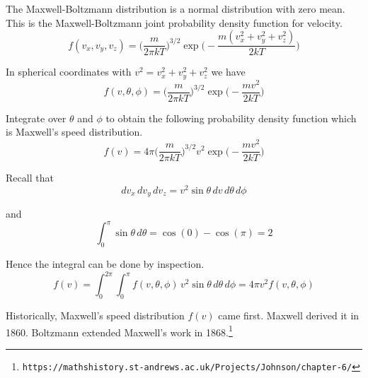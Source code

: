 \documentclass[12pt]{article}
\begin{document}
The Maxwell-Boltzmann distribution is a normal distribution with zero mean.
This is the Maxwell-Boltzmann joint probability density function for velocity.
\begin{equation*}
f(v_x,v_y,v_z)=
\bigg(\frac{m}{2\pi kT}\bigg)^{3/2}
\exp\bigg({-}\frac{m(v_x^2+v_y^2+v_z^2)}{2kT}\bigg)
\end{equation*}

In spherical coordinates with $v^2=v_x^2+v_y^2+v_z^2$ we have
\begin{equation*}
f(v,\theta,\phi)=
\bigg(\frac{m}{2\pi kT}\bigg)^{3/2}
\exp\bigg({-}\frac{mv^2}{2kT}\bigg)
\end{equation*}

Integrate over $\theta$ and $\phi$
to obtain the following probability density function
which is Maxwell's speed distribution.
\begin{equation*}
f(v)=4\pi\bigg(\frac{m}{2\pi kT}\bigg)^{3/2}
v^2\exp\bigg({-}\frac{mv^2}{2kT}\bigg)
\end{equation*}

Recall that
\begin{equation*}
dv_x\,dv_y\,dv_z=v^2\sin\theta\,dv\,d\theta\,d\phi
\end{equation*}

and
\begin{equation*}
\int_0^\pi\sin\theta\,d\theta=\cos(0)-\cos(\pi)=2
\end{equation*}

Hence the integral can be done by inspection.
\begin{equation*}
f(v)=\int_0^{2\pi}\int_0^\pi f(v,\theta,\phi)\,v^2\sin\theta\,d\theta\,d\phi
=4\pi v^2f(v,\theta,\phi)
\end{equation*}

Historically, Maxwell's speed distribution $f(v)$ came first.
Maxwell derived it in 1860.
Boltzmann extended Maxwell's work in 1868.\footnote{
\tt https://mathshistory.st-andrews.ac.uk/Projects/Johnson/chapter-6/}
\end{document}

